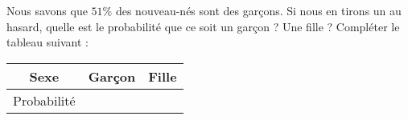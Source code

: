 
\begin{exercice}\label{exosmath-0194}

Nous savons que \( 51\%\) des nouveau-nés sont des garçons. Si nous en tirons un au hasard, quelle est le probabilité que ce soit un garçon ? Une fille ? Compléter le tableau suivant :
\begin{center}
\begin{tabular}[]{|c||c|c|}
    \hline
    Sexe&Garçon&Fille\\
    \hline\hline
    Probabilité&&\\
    \hline
\end{tabular}
\end{center}

\end{exercice}
